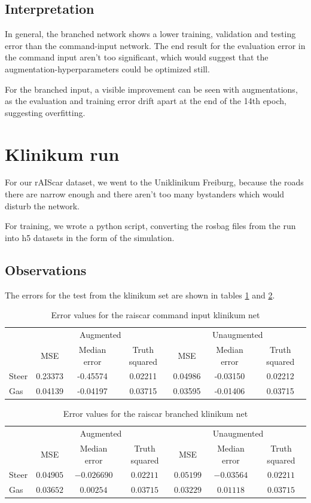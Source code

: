 \documentclass[a4paper]{article}
\begin{document}
\subsection{Interpretation}
In general, the branched network shows a lower training, validation and testing
error than the command-input network. The end result for the evaluation error in
the command input aren't too significant, which would suggest that the
augmentation-hyperparameters could be optimized still.

For the branched input, a visible improvement can be seen with augmentations, as
the evaluation and training error drift apart at the end of the 14th epoch,
suggesting overfitting.
\newpage{}
\section{Klinikum run}
For our rAIScar dataset, we went to the Uniklinikum Freiburg, because the roads
there are narrow enough and there aren't too many bystanders which would disturb
the network.

For training, we wrote a python script, converting the rosbag files from the run
into h5 datasets in the form of the simulation.

\subsection{Observations}
The errors for the test from the klinikum set are shown in tables
\ref{tab:error_command_aug_klinikum} and \ref{tab:error_branched_aug_klinikum}.

\begin{table}[H]
	\centering
	\caption{Error values for the raiscar command input klinikum net}
	\label{tab:error_command_aug_klinikum}
	\begin{tabular}{lccc|ccc}
		&\multicolumn{3}{c|}{Augmented} & \multicolumn{3}{c}{Unaugmented} \\
		& MSE & Median error & Truth squared & MSE & Median error & Truth squared\\ \hline
		Steer & 0.23373 & -0.45574 & 0.02211 & 0.04986 & -0.03150 & 0.02212 \\
		Gas & 0.04139 & -0.04197 & 0.03715 & 0.03595 & -0.01406 & 0.03715
	\end{tabular}
\end{table}
\begin{table}[H]
	\centering
	\caption{Error values for the raiscar branched klinikum net}
	\label{tab:error_branched_aug_klinikum}
	\begin{tabular}{lccc|ccc}
		&\multicolumn{3}{c|}{Augmented} & \multicolumn{3}{c}{Unaugmented} \\
		& MSE & Median error & Truth squared & MSE & Median error & Truth squared\\ \hline
		Steer & $0.04905$ & $-0.026690$ & $0.02211$ & $0.05199$ & $-0.03564$ & $0.02211$ \\
		Gas & $0.03652$ & $0.00254$ & $0.03715$ & $0.03229$ & $0.01118$ & $0.03715$
	\end{tabular}
\end{table}
\end{document}
